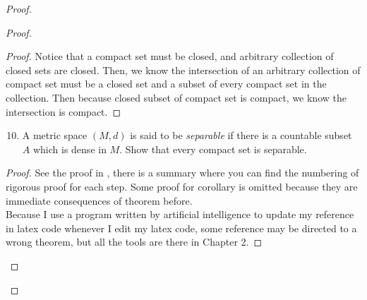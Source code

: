 \documentclass{report}
\begin{document}
\begin{proof}
\begin{proof}
\begin{proof}
Notice that a compact set must be closed, and arbitrary collection of closed sets are closed. Then, we know the intersection of an arbitrary collection of compact set must be a closed set and a subset of every compact set in the collection. Then because closed subset of compact set is compact, we know the intersection is compact.
\end{proof}
\begin{question}{}{}
\begin{enumerate}
    \setcounter{enumi}{9}
    \item A metric space \( (M,d) \) is said to be \textit{separable} if there is a countable subset \( A \) which is dense in \( M \). Show that every compact set is separable.
\end{enumerate}
\end{question}
\begin{proof}
See the proof in , there is a summary where you can find the numbering of rigorous proof for each step. Some proof for corollary is omitted because they are immediate consequences of theorem before.\\

Because I use a program written by artificial intelligence to update my reference in latex code whenever I edit my latex code, some reference may be directed to a wrong theorem, but all the tools are there in Chapter 2. 
\end{proof}

\end{proof}
\end{proof}
\end{document}
